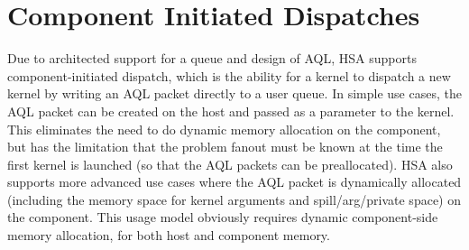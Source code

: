 \documentclass[final]{book}
\begin{document}
\section{Component Initiated Dispatches} \label{architected}
\hypertarget{architectedchptr}{}

Due to architected support for a queue and design of AQL, HSA supports
component-initiated dispatch, which is the ability for a kernel to dispatch a
new kernel by writing an AQL packet directly to a user queue. In simple use
cases, the AQL packet can be created on the host and passed as a parameter to
the kernel. This eliminates the need to do dynamic memory allocation on the
component, but has the limitation that the problem fanout must be known at the
time the first kernel is launched (so that the AQL packets can be
preallocated). HSA also supports more advanced use cases where the AQL packet is
dynamically allocated (including the memory space for kernel arguments and
spill/arg/private space) on the component. This usage model obviously requires
dynamic component-side memory allocation, for both host and component memory.
\end{document}
